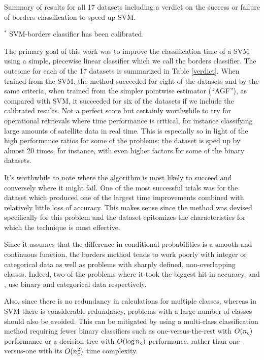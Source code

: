 \label{conclusion}

\begin{table}
	\caption{Summary of results for all 17 datasets including a verdict on the success or failure of borders classification to speed up SVM.}
	\label{verdict}
	
	\vspace{1 ex}

	\raggedright $^*$ SVM-borders classifier has been calibrated.
\end{table}

The primary goal of this work was to improve the classification time of a SVM
using a simple, piecewise linear classifier which we call the borders classifier.
The outcome for each of the 17 datasets is summarized in Table \ref{verdict}.
When trained from the SVM, the method succeeded for eight of the datasets and
by the same criteria, when trained from the simpler pointwise estimator (``AGF''),
as compared with SVM, it succeeded for six of the datasets
if we include the calibrated  results.
Not a perfect score but certainly worthwhile to try for operational retrievals
where time performance is critical, for instance classifying large amounts of satellite
data in real time.
This is especially so in light of the high performance ratios for some of the problems:
the  dataset is sped up by almost 20 times,
for instance, with even higher factors for some of the binary datasets.

It's worthwhile to note where the algorithm is most likely to succeed and conversely
where it might fail.
One of the most successful trials was for the  dataset which produced one of
the largest time improvements combined with relatively little loss of accuracy.
This makes sense since the method was devised specifically for this problem and
the  dataset epitomizes the characteristics for which the technique is most
effective.

Since it assumes that the difference in conditional probabilities is a
smooth and continuous function, the borders method 
tends to work poorly with integer or categorical data as well as problems
with sharply defined, non-overlapping classes.
Indeed, two of the problems where it took the biggest hit in accuracy,  and , 
use binary and categorical data respectively.

Also, since there is no redundancy in calculations for multiple classes, 
whereas in SVM there is considerable redundancy, problems with a large number of
classes should also be avoided.
This can be mitigated by using a multi-class classification method
requiring fewer binary classifiers such as one-versus-the-rest with $O(n_c)$
performance or a decision tree with $O(\log n_c)$ performance, rather than
one-versus-one with its $O(n_c^2)$ time complexity.

